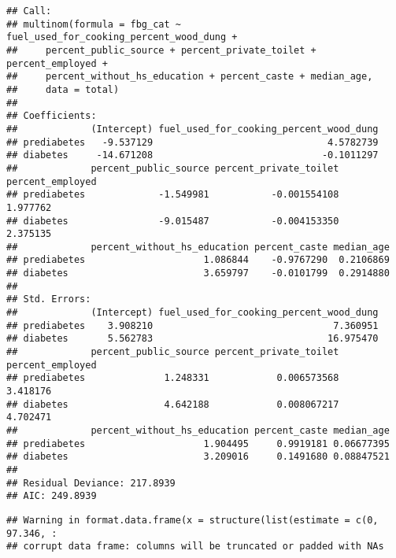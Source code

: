 \documentclass[]{article}
\newenvironment{Shaded}{\begin{snugshade}}{\end{snugshade}}
\newcommand{\DataTypeTok}[1]{\textcolor[rgb]{0.13,0.29,0.53}{#1}}
\newcommand{\DecValTok}[1]{\textcolor[rgb]{0.00,0.00,0.81}{#1}}
\newcommand{\KeywordTok}[1]{\textcolor[rgb]{0.13,0.29,0.53}{\textbf{#1}}}
\newcommand{\NormalTok}[1]{#1}
\newcommand{\OperatorTok}[1]{\textcolor[rgb]{0.81,0.36,0.00}{\textbf{#1}}}
\newcommand{\StringTok}[1]{\textcolor[rgb]{0.31,0.60,0.02}{#1}}
\begin{document}
\begin{verbatim}
## Call:
## multinom(formula = fbg_cat ~ fuel_used_for_cooking_percent_wood_dung + 
##     percent_public_source + percent_private_toilet + percent_employed + 
##     percent_without_hs_education + percent_caste + median_age, 
##     data = total)
## 
## Coefficients:
##             (Intercept) fuel_used_for_cooking_percent_wood_dung
## prediabetes   -9.537129                               4.5782739
## diabetes     -14.671208                              -0.1011297
##             percent_public_source percent_private_toilet percent_employed
## prediabetes             -1.549981           -0.001554108         1.977762
## diabetes                -9.015487           -0.004153350         2.375135
##             percent_without_hs_education percent_caste median_age
## prediabetes                     1.086844    -0.9767290  0.2106869
## diabetes                        3.659797    -0.0101799  0.2914880
## 
## Std. Errors:
##             (Intercept) fuel_used_for_cooking_percent_wood_dung
## prediabetes    3.908210                                7.360951
## diabetes       5.562783                               16.975470
##             percent_public_source percent_private_toilet percent_employed
## prediabetes              1.248331            0.006573568         3.418176
## diabetes                 4.642188            0.008067217         4.702471
##             percent_without_hs_education percent_caste median_age
## prediabetes                     1.904495     0.9919181 0.06677395
## diabetes                        3.209016     0.1491680 0.08847521
## 
## Residual Deviance: 217.8939 
## AIC: 249.8939
\end{verbatim}

\begin{Shaded}
\end{Shaded}

\begin{verbatim}
## Warning in format.data.frame(x = structure(list(estimate = c(0, 97.346, :
## corrupt data frame: columns will be truncated or padded with NAs
\end{verbatim}
\end{document}
